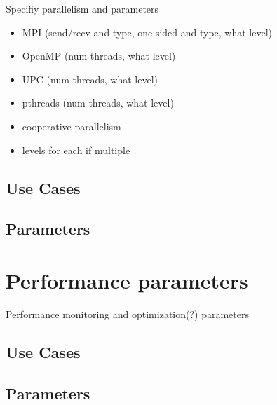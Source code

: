 \documentclass{book}
\begin{document}
Specifiy parallelism and parameters

\begin{itemize}
\item MPI (send/recv and type, one-sided and type, what level)
\item OpenMP (num threads, what level)
\item UPC (num threads, what level)
\item pthreads (num threads, what level)
\item cooperative parallelism
\item levels for each if multiple
\end{itemize}

\subsection{Use Cases}
\subsection{Parameters}
\section{Performance parameters} \label{s:performance}

Performance monitoring and optimization(?) parameters

\subsection{Use Cases}
\subsection{Parameters}

\end{document}

